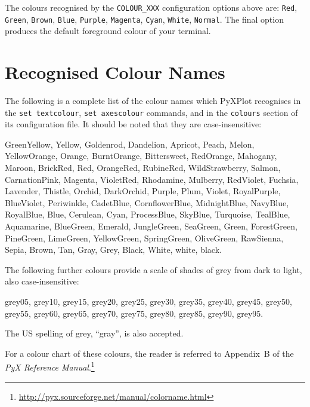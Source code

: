 The colours recognised by the {\tt COLOUR\_XXX} configuration options above are: {\tt Red}, {\tt Green}, {\tt Brown}, {\tt Blue}, {\tt Purple}, {\tt Magenta}, {\tt Cyan}, {\tt White}, {\tt Normal}. The final option produces the default foreground colour of your terminal.

\section{Recognised Colour Names}
\label{colour_names}

The following is a complete list of the colour names which PyXPlot recognises in the {\tt set textcolour}, {\tt set axescolour} commands, and in the {\tt colours} section of its configuration file. It should be noted that they are case-insensitive:

GreenYellow, Yellow, Goldenrod, Dandelion, Apricot, Peach, Melon, YellowOrange, Orange, BurntOrange, Bittersweet, RedOrange, Mahogany, Maroon, BrickRed, Red, OrangeRed, RubineRed, WildStrawberry, Salmon, CarnationPink, Magenta, VioletRed, Rhodamine, Mulberry, RedViolet, Fuchsia, Lavender, Thistle, Orchid, DarkOrchid, Purple, Plum, Violet, RoyalPurple, BlueViolet, Periwinkle, CadetBlue, CornflowerBlue, MidnightBlue, NavyBlue, RoyalBlue, Blue, Cerulean, Cyan, ProcessBlue, SkyBlue, Turquoise, TealBlue, Aquamarine, BlueGreen, Emerald, JungleGreen, SeaGreen, Green, ForestGreen, PineGreen, LimeGreen, YellowGreen, SpringGreen, OliveGreen, RawSienna, Sepia, Brown, Tan, Gray, Grey, Black, White, white, black.

The following further colours provide a scale of shades of grey from dark to light, also case-insensitive:

grey05, grey10, grey15, grey20, grey25, grey30, grey35, grey40, grey45, grey50, grey55, grey60, grey65, grey70, grey75, grey80, grey85, grey90, grey95.

The US spelling of grey, ``gray'', is also accepted.

For a colour chart of these colours, the reader is referred to Appendix~B of the {\it PyX Reference Manual}.\footnote{\url{http://pyx.sourceforge.net/manual/colorname.html}}
